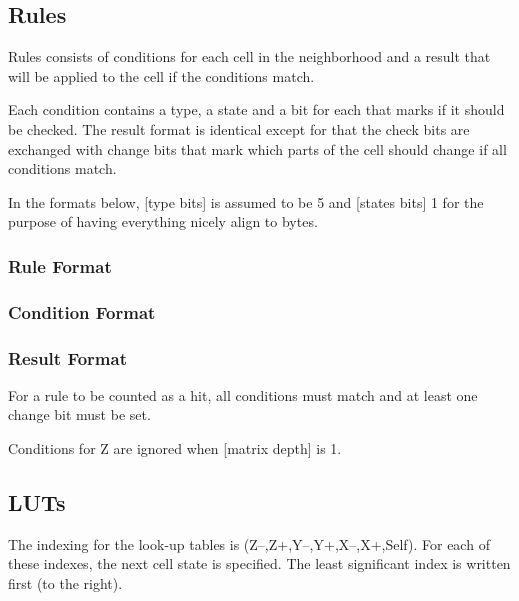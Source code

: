 \documentclass[a4paper,twoside,12pt]{article}
\begin{document}
\clearpage
\subsection{Rules}

Rules consists of conditions for each cell in the neighborhood and a result that will be applied to the cell if the conditions match.

Each condition contains a type, a state and a bit for each that marks if it should be checked.
The result format is identical except for that the check bits are exchanged with change bits that mark which parts of the cell should change if all conditions match.

In the formats below, [type bits] is assumed to be 5 and [states bits] 1 for the purpose of having everything nicely align to bytes.

\subsubsection*{Rule Format}


\subsubsection*{Condition Format}


\subsubsection*{Result Format}


\notes

For a rule to be counted as a hit, all conditions must match and at least one change bit must be set.

Conditions for Z are ignored when [matrix depth] is 1.

\clearpage
\subsection{LUTs}

The indexing for the look-up tables is (Z–,Z+,Y–,Y+,X–,X+,Self).
For each of these indexes, the next cell state is specified.
The least significant index is written first (to the right).
\end{document}
